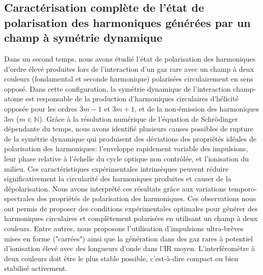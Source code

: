 \subsection*{Caractérisation complète de l'état de polarisation des harmoniques générées par un champ à symétrie dynamique}
Dans un second temps, nous avons étudié l'état de polarisation des harmoniques d'ordre élevé produites lors de l'interaction d'un gaz rare avec un champ à deux couleurs (fondamental et seconde harmonique) polarisées circulairement en sens opposé. Dans cette configuration, la symétrie dynamique de l'interaction champ-atome est responsable de la production d'harmoniques circulaires d'hélicité opposée pour les ordres $3m-1$ et $3m+1$, et de la non-émission des harmoniques $3m$ ($m \in \mathbb{N}$). Grâce à la résolution numérique de l'équation de Schrödinger dépendante du temps, nous avons identifié plusieurs causes possibles de rupture de la symétrie dynamique qui produisent des déviations des propriétés idéales de polarisation des harmoniques: l'enveloppe rapidement variable des impulsions, leur phase relative à l'échelle du cycle optique non contrôlée, et l'ionisation du milieu. Ces caractéristiques expérimentales intrinsèques peuvent réduire significativement la circularité des harmoniques produites et causer de la dépolarisation. Nous avons interprété ces résultats grâce aux variations temporo-spectrales des propriétés de polarisation des harmoniques. Ces observations nous ont permis de proposer des conditions expérimentales optimales pour générer des harmoniques circulaires et complètement polarisées en utilisant un champ à deux couleurs. Entre autres, nous proposons l'utilisation d'impulsions ultra-brèves mises en forme ("carrées") ainsi que la génération dans des gaz rares à potentiel d'ionisation élevé avec des longueurs d'onde dans l'IR moyen. L'interféromètre à deux couleurs doit être le plus stable possible, c'est-à-dire compact ou bien stabilisé activement. 

